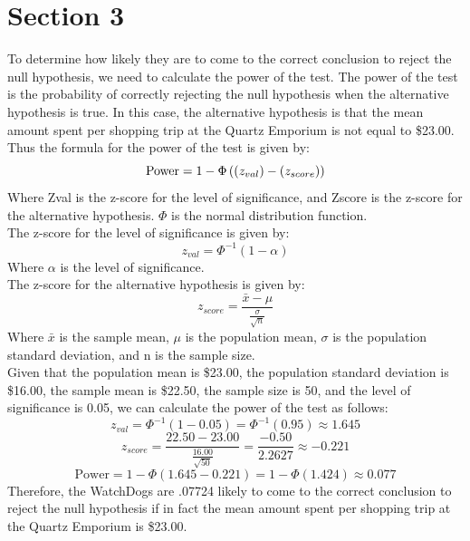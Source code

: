 \documentclass{article}
\begin{document}
\section{Section 3}
To determine how likely they are to come to the correct conclusion to reject the null hypothesis, we need to calculate the power of the test. The power of the test is the probability of correctly rejecting the null hypothesis when the alternative hypothesis is true. In this case, the alternative hypothesis is that the mean amount spent per shopping trip at the Quartz Emporium is not equal to \$23.00.\\
Thus the formula for the power of the test is given by:
\begin{equation}
    \text{Power} = 1 - \Phi\left( \text(z_{val}) - \text(z_{score}) \right) 
\end{equation}
Where Zval is the z-score for the level of significance, and Zscore is the z-score for the alternative hypothesis. $\Phi$ is the normal distribution function.\\
The z-score for the level of significance is given by:
\begin{equation}
    z_{val} = \Phi^{-1}\left(1 - \alpha\right)
\end{equation}
Where $\alpha$ is the level of significance.\\
The z-score for the alternative hypothesis is given by:
\begin{equation}
    z_{score} = \frac{\bar{x} - \mu}{\frac{\sigma}{\sqrt{n}}}
\end{equation}
Where $\bar{x}$ is the sample mean, $\mu$ is the population mean, $\sigma$ is the population standard deviation, and n is the sample size.\\
Given that the population mean is \$23.00, the population standard deviation is \$16.00, the sample mean is \$22.50, the sample size is 50, and the level of significance is 0.05, we can calculate the power of the test as follows:
\begin{equation}
    z_{val} = \Phi^{-1}\left(1 - 0.05\right) = \Phi^{-1}\left(0.95\right) \approx 1.645
\end{equation}
\begin{equation}
    z_{score} = \frac{22.50 - 23.00}{\frac{16.00}{\sqrt{50}}} = \frac{-0.50}{2.2627} \approx -0.221
\end{equation}
\begin{equation}
    \text{Power} = 1 - \Phi\left(1.645 - 0.221\right) = 1 - \Phi\left(1.424\right) \approx 0.077
\end{equation}
Therefore, the WatchDogs are .07724 likely to come to the correct conclusion to reject the null hypothesis if in fact the mean amount spent per shopping trip at the Quartz Emporium is \$23.00.
\end{document}
